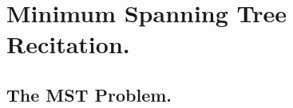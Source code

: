   



%
%





\ifdefined\BOOK
\else
\setcounter{chapter}{10}
\fi
\section{Minimum Spanning Tree Recitation.} 


\subsection{The MST Problem.}

